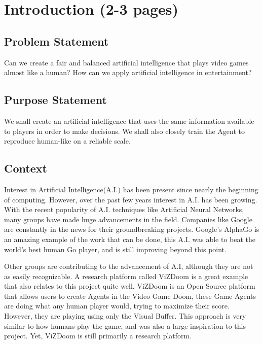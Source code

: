 \chapter{Introduction (2-3 pages)}


\section{Problem Statement} 

Can we create a fair and balanced artificial intelligence that plays video games almost like a human? How can we apply artificial intelligence in entertainment?





\section{Purpose Statement} 

We shall create an artificial intelligence that uses the same information available to players in order to make decisions. We shall also closely train the Agent to reproduce human-like on a reliable scale. 





\section{Context} 

Interest in Artificial Intelligence(A.I.) has been present since nearly the beginning of computing. However, over the past few years interest in A.I. has been growing. With the recent popularity of A.I. techniques like Artificial Neural Networks, many groups have made huge advancements in the field. Companies like Google are constantly in the news for their groundbreaking projects. Google's AlphaGo is an amazing example of the work that can be done, this A.I. was able to beat the world's best human Go player, and is still improving beyond this point.

Other groups are contributing to the advancement of A.I, although they are not as easily recognizable. A research platform called ViZDoom is a great example that also relates to this project quite well. ViZDoom is an Open Source platform that allows users to create Agents in the Video Game Doom, these Game Agents are doing what any human player would, trying to maximize their score. However, they are playing using only the Visual Buffer. This approach is very similar to how humans play the game, and was also a large inspiration to this project. Yet, ViZDoom is still primarily a research platform.

